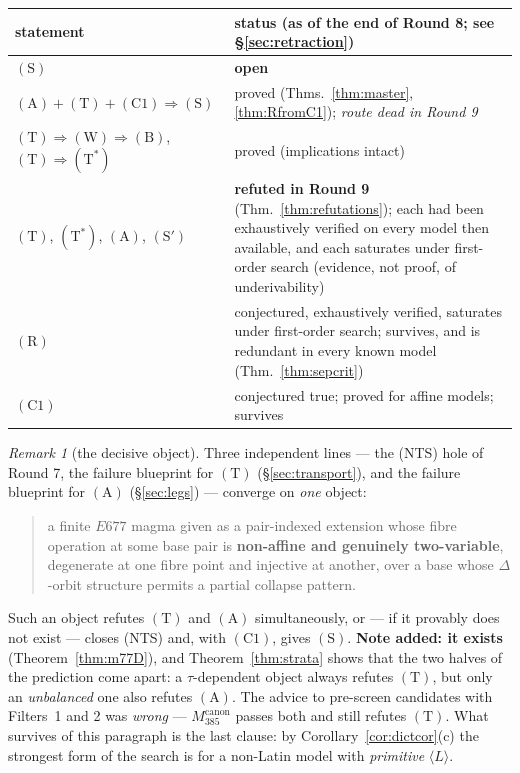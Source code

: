 \documentclass[11pt]{article}
\theoremstyle{plain}
\theoremstyle{definition}
\theoremstyle{remark}
\newtheorem*{remark*}{Remark}
\numberwithin{equation}{section}
\begin{document}
\begin{center}
{\footnotesize
\begin{tabular}{lp{}}
\toprule
statement & status (as of the end of Round 8; see \S\ref{sec:retraction})\\
\midrule
$(\mathrm{S})$ & \textbf{open}\\
$(\mathrm{A})+(\mathrm{T})+(\mathrm{C1})\Rightarrow(\mathrm{S})$ &
proved (Thms.~\ref{thm:master}, \ref{thm:RfromC1}); \emph{route dead in Round 9}\\
$(\mathrm{T})\Rightarrow(\mathrm{W})\Rightarrow(\mathrm{B})$,
$(\mathrm{T})\Rightarrow(\mathrm{T}^{*})$ & proved (implications intact)\\
$(\mathrm{T})$, $(\mathrm{T}^{*})$, $(\mathrm{A})$, $(\mathrm{S}')$ &
\textbf{refuted in Round 9} (Thm.~\ref{thm:refutations}); each had been
exhaustively verified on every model then available, and each saturates under
first-order search (evidence, not proof, of underivability)\\
$(\mathrm{R})$ & conjectured, exhaustively verified, saturates under first-order
search; survives,
and is redundant in every known model (Thm.~\ref{thm:sepcrit})\\
$(\mathrm{C1})$ & conjectured true; proved for affine models; survives\\
\bottomrule
\end{tabular}}
\end{center}

\begin{remark*}[the decisive object]
Three independent lines --- the (NTS) hole of Round 7, the failure blueprint for
$(\mathrm{T})$ (\S\ref{sec:transport}), and the failure blueprint for
$(\mathrm{A})$ (\S\ref{sec:legs}) --- converge on \emph{one} object:
\begin{quote}
a finite $E677$ magma given as a pair-indexed extension whose fibre operation at
some base pair is \textbf{non-affine and genuinely two-variable}, degenerate at
one fibre point and injective at another, over a base whose $\Delta$-orbit
structure permits a partial collapse pattern.
\end{quote}
Such an object refutes $(\mathrm{T})$ and $(\mathrm{A})$ simultaneously, or ---
if it provably does not exist --- closes (NTS) and, with $(\mathrm{C1})$, gives
$(\mathrm{S})$. \textbf{Note added: it exists} (Theorem~\ref{thm:m77D}), and
Theorem~\ref{thm:strata} shows that the two halves of the prediction come apart:
a $\tau$-dependent object always refutes $(\mathrm{T})$, but only an
\emph{unbalanced} one also refutes $(\mathrm{A})$. The advice to pre-screen
candidates with Filters~1 and 2 was \emph{wrong} --- $M_{385}^{\mathrm{canon}}$
passes both and still refutes $(\mathrm{T})$. What survives of this paragraph is
the last clause: by Corollary~\ref{cor:dictcor}(c) the strongest form of the
search is for a non-Latin model with \emph{primitive} $\langle L\rangle$.
\end{remark*}
\end{document}
